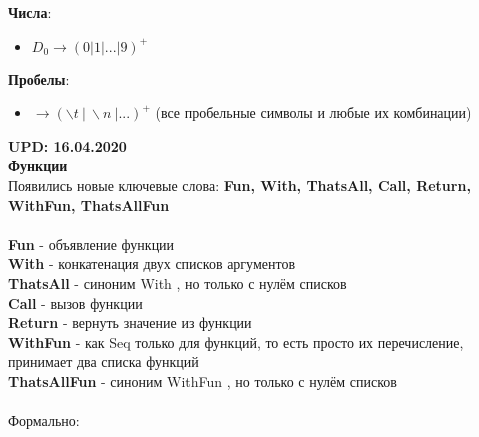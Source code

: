 \documentclass[12pt]{article}
\begin{document}
\textbf{Числа}: 
\begin{itemize}
	\item $D_0 \to (0|1|...|9)^+$
\end{itemize}

\textbf{Пробелы}: \\

    \begin{itemize}
  	\item \textvisiblespace $\to (\backslash t \ | \ \backslash n \ | ...)^+$
  	(все пробельные символы и любые их комбинации)
  \end{itemize}

\vspace{\baselineskip}
\vspace{\baselineskip}
\textbf{UPD: 16.04.2020} \\
\textbf{Функции} \\
Появились новые ключевые слова: \textbf{Fun, With, ThatsAll, Call, Return, WithFun, ThatsAllFun} \\
\\
\textbf{Fun} - объявление функции \\
\textbf{With} - конкатенация двух списков аргументов \\
\textbf{ThatsAll} - синоним With , но только с нулём списков \\
\textbf{Call} - вызов функции \\
\textbf{Return} - вернуть значение из функции \\
\textbf{WithFun} - как Seq только для функций, то есть просто их перечисление, принимает два списка функций \\
\textbf{ThatsAllFun} - синоним WithFun , но только с нулём списков \\
\\
Формально: \\
\end{document}
